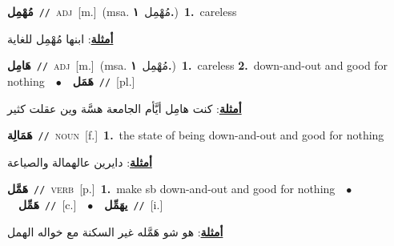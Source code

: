 \documentclass[10pt,a4paper,twoside]{article} %
\begin{document}
\begin{multicols}{2}
{\setlength\topsep{0pt}\textbf{\foreignlanguage{arabic}{مُهْمِل}}\ {\color{gray}\texttt{//}\color{black}}\ \textsc{adj}\ [m.]\ \color{gray}(msa. \foreignlanguage{arabic}{مُهْمِل}~\foreignlanguage{arabic}{\textbf{١.}})\color{black}\ \textbf{1.}~careless\  \begin{flushright}\color{gray}\foreignlanguage{arabic}{\textbf{\underline{\foreignlanguage{arabic}{أمثلة}}}: ابنها مُهْمِل للغاية}\end{flushright}\color{black}} \vspace{2mm}

{\setlength\topsep{0pt}\textbf{\foreignlanguage{arabic}{هَامِل}}\ {\color{gray}\texttt{//}\color{black}}\ \textsc{adj}\ [m.]\ \color{gray}(msa. \foreignlanguage{arabic}{مُهْمِل}~\foreignlanguage{arabic}{\textbf{١.}})\color{black}\ \textbf{1.}~careless  \textbf{2.}~down-and-out and good for nothing\ \ $\bullet$\ \ \setlength\topsep{0pt}\textbf{\foreignlanguage{arabic}{هَمَل}}\ {\color{gray}\texttt{//}\color{black}}\ [pl.]\  \begin{flushright}\color{gray}\foreignlanguage{arabic}{\textbf{\underline{\foreignlanguage{arabic}{أمثلة}}}: كنت هامِل أيَّأم الجامعة هسَّة وين عقلت كثير}\end{flushright}\color{black}} \vspace{2mm}

{\setlength\topsep{0pt}\textbf{\foreignlanguage{arabic}{هَمَالِة}}\ {\color{gray}\texttt{//}\color{black}}\ \textsc{noun}\ [f.]\ \textbf{1.}~the state of being down-and-out and good for nothing\  \begin{flushright}\color{gray}\foreignlanguage{arabic}{\textbf{\underline{\foreignlanguage{arabic}{أمثلة}}}: دايرين عالهمالة والصياعة}\end{flushright}\color{black}} \vspace{2mm}

{\setlength\topsep{0pt}\textbf{\foreignlanguage{arabic}{هَمَّل}}\ {\color{gray}\texttt{//}\color{black}}\ \textsc{verb}\ [p.]\ \textbf{1.}~make sb down-and-out and good for nothing\ \ $\bullet$\ \ \setlength\topsep{0pt}\textbf{\foreignlanguage{arabic}{هَمِّل}}\ {\color{gray}\texttt{//}\color{black}}\ [c.]\ \ $\bullet$\ \ \setlength\topsep{0pt}\textbf{\foreignlanguage{arabic}{يهَمِّل}}\ {\color{gray}\texttt{//}\color{black}}\ [i.]\  \begin{flushright}\color{gray}\foreignlanguage{arabic}{\textbf{\underline{\foreignlanguage{arabic}{أمثلة}}}: هو شو هَمَّله غير السكنة مع خواله الهمل}\end{flushright}\color{black}} \vspace{2mm}


\end{multicols}
\end{document}
